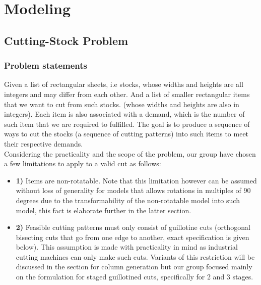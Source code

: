 \documentclass[a4paper]{article}
\begin{document}
    \section{Modeling}
    \subsection{Cutting-Stock Problem}
    \subsubsection{Problem statements}


    Given a list of rectangular sheets, i.e stocks, 
    whose widths and heights are all integers and may differ from each other.
    And a list of smaller rectangular items that we want to cut from such stocks.
    (whose widths and heights are also in integers). 
    Each item is also associated with a demand, which is the number of such item that we are required to fulfilled.
    The goal is to produce a sequence of ways to cut the stocks (a sequence of cutting patterns) into such items to meet their respective demands.
    \vspace{0.2cm}\\
    Considering the practicality and the scope of the problem, our group have chosen a few limitations to apply to a valid cut as follows:
    \begin{itemize}
        \item \textbf{1)} Items are non-rotatable. 
        Note that this limitation however can be assumed without loss of generality for models that allows rotations in multiples of 90 degrees due to the transformability of the non-rotatable model into such model, this fact is elaborate further in the latter section.
        \item \textbf{2)} Feasible cutting patterns must only consist of guillotine cuts (orthogonal bisecting cuts that go from one edge to another, exact specification is given below).
        This assumption is made with practicality in mind as industrial cutting machines can only make such cuts. 
        Variants of this restriction will be discussed in the section for column generation but our group focused mainly on the formulation for staged guillotined cuts, specifically for 2 and 3 stages. 
    \end{itemize}
\end{document}

